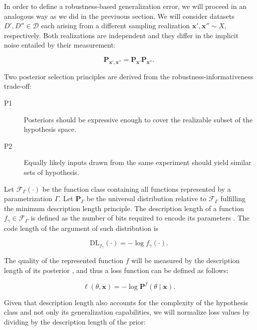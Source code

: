 In order to define a robustness-based generalization error, we will proceed in an
analogous way as we did in the previuous section. We will consider datasets $D', D'' \in \mathcal{D}$
each arising from a different sampling realization $\bm{x}', \bm{x}'' \sim \underbar{X}$, respectively. 
Both realizations are independent and they differ in the implicit noise entailed by
their measurement:

$$
    \mathbf{P}_{\bm{x}', \bm{x}''} = \mathbf{P}_{\bm{x}'} \mathbf{P}_{\bm{x}''}.
$$

Two posterior selection principles are derived from the robustness-informativeness trade-off:
\vspace{-2mm}
\begin{description}
    \item[P1] Posteriors should be expressive enough to cover the realizable subset of the hypothesis space.
    \vspace{-3mm}
    \item[P2] Equally likely inputs drawn from the same experiment should yield similar sets of hypothesis.
\end{description}

\begin{definition}
    Let $\mathcal{F}_{\Gamma}(\cdot)$ be the function class containing all functions 
    represented by a parametrization $\Gamma$. Let $\mathbf{P}_{\Gamma}$ be the
    universal distribution relative to $\mathcal{F}_{\Gamma}$ fulfilling the minimum
    description length principle. The description length of a function $f_\gamma \in \mathcal{F}_{\Gamma}$ 
    is defined as the number of bits required to encode its parameters
    \cite{grunwaldMinimumDescriptionLength2019}.
    The code length of the argument of such distribution is

    $$
    \text{DL}_{f_{\gamma}}(\cdot) = -\log f_{\gamma}(\cdot).
    $$
\end{definition}

The quality of the represented function $f$ will be measured by the description
length of its posterior \cite{buhmannDataScienceAlgorithms2022}, and 
thus a loss function can be defined as follows:

$$
    \ell (\theta, \bm{x}) = - \log \mathbf{P}^f (\theta \mid \bm {x}).
$$

Given that description length also accounts for the complexity of the hypothesis
class and not only its generalization capabilities, we will normalize loss values by
dividing by the description length of the prior:


